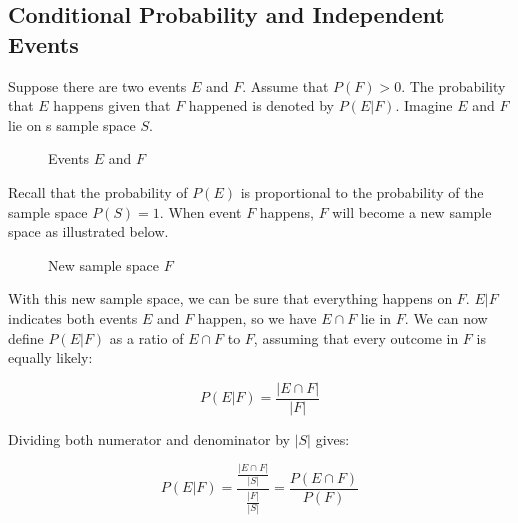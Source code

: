 \documentclass[12pt, a4paper]{article}
\begin{document}
\subsection{Conditional Probability and Independent Events}

Suppose there are two events $E$ and $F$. Assume that $P(F)>0$. The probability that $E$ happens given that $F$ happened is denoted by $P(E|F)$. Imagine $E$ and $F$ lie on s sample space $S$.

\def\firstcircle{(0,0) circle (1.8cm)}
\def\secondcircle{(0:2cm) circle (1.8cm)}
\begin{figure}[H]
\centering
{}
\caption{Events $E$ and $F$}
\end{figure}

Recall that the probability of $P(E)$ is proportional to the probability of the sample space $P(S)=1$. When event $F$ happens, $F$ will become a new sample space as illustrated below.

\begin{figure}[H]
\centering
{}
\caption{New sample space $F$}
\end{figure}

With this new sample space, we can be sure that everything happens on $F$. $E|F$ indicates both events $E$ and $F$ happen, so we have $E \cap F$ lie in $F$. We can now define $P(E|F)$ as a ratio of $E \cap F$ to $F$, assuming that every outcome in $F$ is equally likely:

$$P(E|F)=\frac{|E \cap F|}{|F|}$$

Dividing both numerator and denominator by $|S|$ gives:

$$P(E|F)=\frac{\frac{|E \cap F|}{|S|}}{\frac{|F|}{|S|}}=\frac{P(E \cap F)}{P(F)}$$
\end{document}

